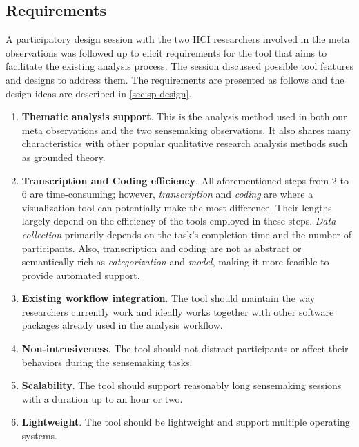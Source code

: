 \subsection{Requirements}
A participatory design session with the two HCI researchers involved in the meta observations was followed up to elicit requirements for the tool that aims to facilitate the existing analysis process. The session discussed possible tool features and designs to address them. The requirements are presented as follows and the design ideas are described in \autoref{sec:sp-design}.

\begin{enumerate}
	\item \textbf{Thematic analysis support}. This is the analysis method used in both our meta observations and the two sensemaking observations. It also shares many characteristics with other popular qualitative research analysis methods such as grounded theory.

	\item \textbf{Transcription and Coding efficiency}. All aforementioned steps from 2 to 6 are time-consuming; however, \emph{transcription} and \emph{coding} are where a visualization tool can potentially make the most difference. Their lengths largely depend on the efficiency of the tools employed in these steps. \emph{Data collection} primarily depends on the task's completion time and the number of participants. Also, transcription and coding are not as abstract or semantically rich as \emph{categorization} and \emph{model}, making it more feasible to provide automated support.

%
%
	\item \textbf{Existing workflow integration}. The tool should maintain the way researchers currently work and ideally works together with other software packages already used in the analysis workflow.
	\item \textbf{Non-intrusiveness}. The tool should not distract participants or affect their behaviors during the sensemaking tasks.
	\item \textbf{Scalability}. The tool should support reasonably long sensemaking sessions with a duration up to an hour or two.
	\item \textbf{Lightweight}. The tool should be lightweight and support multiple operating systems.

\end{enumerate}